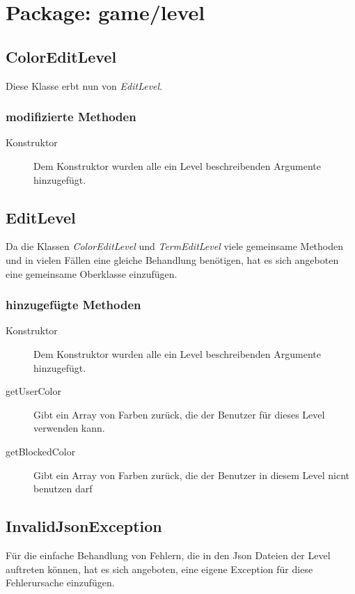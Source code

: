 \section{Package: game/level}

\subsection{ColorEditLevel}
	Diese Klasse erbt nun von \emph{EditLevel}.

	\subsubsection{modifizierte Methoden}
		\begin{description}
			\item[Konstruktor] Dem Konstruktor wurden alle ein Level beschreibenden Argumente hinzugefügt.
		\end{description}


\subsection{EditLevel}
	Da die Klassen \emph{ColorEditLevel} und \emph{TermEditLevel} viele gemeinsame Methoden und in vielen Fällen 
	eine gleiche Behandlung benötigen, hat es sich angeboten eine gemeinsame Oberklasse einzufügen. 

	\subsubsection{hinzugefügte Methoden}
		\begin{description}
			\item[Konstruktor] Dem Konstruktor wurden alle ein Level beschreibenden Argumente hinzugefügt.
			\item[getUserColor] Gibt ein Array von Farben zurück, die der Benutzer für dieses Level verwenden kann.
			\item[getBlockedColor] Gibt ein Array von Farben zurück, die der Benutzer in diesem Level nicnt benutzen 
				darf
		\end{description}


\subsection{InvalidJsonException}
	Für die einfache Behandlung von Fehlern, die in den Json Dateien der Level auftreten können, hat es sich 
	angeboten, eine eigene Exception für diese Fehlerursache einzufügen.   


